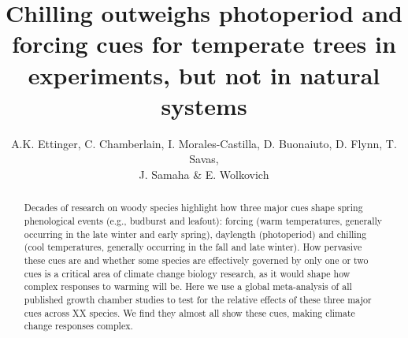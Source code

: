 \documentclass{article}
\begin{document}

\title{Chilling outweighs photoperiod and forcing cues for temperate trees in experiments, but not in natural systems} %

\author{A.K. Ettinger, C. Chamberlain, I. Morales-Castilla, D. Buonaiuto, D. Flynn, T. Savas, \\J. Samaha \& E. Wolkovich}
\maketitle  %




\begin{abstract}
Decades of research on woody species highlight how three major cues shape spring phenological events (e.g., budburst and leafout): forcing (warm temperatures, generally occurring in the late winter and early spring), daylength (photoperiod) and chilling (cool temperatures, generally occurring in the fall and late winter). How pervasive these cues are and whether some species are effectively governed by only one or two cues is a critical area of climate change biology research, as it would shape how complex responses to warming will be. Here we use a global meta-analysis of all published growth chamber studies to test for the relative effects of these three major cues across XX species. We find they almost all show these cues, making climate change responses complex. %
\end{abstract}
\end{document}
